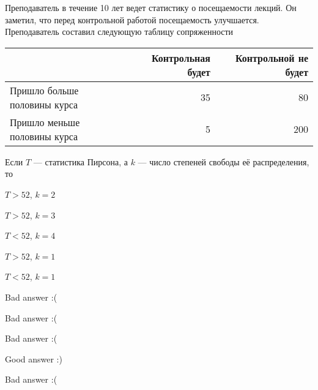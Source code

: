 
\begin{question}
Преподаватель в течение 10 лет ведет статистику о посещаемости лекций.
Он заметил, что перед контрольной работой посещаемость улучшается.
Преподаватель составил следующую таблицу сопряженности

\vspace{5mm}
\begin{tabular}{lrr}
\toprule
& Контрольная будет & Контрольной не будет \\
\midrule
Пришло больше половины курса & 35 & 80 \\
Пришло меньше половины курса & 5 & 200 \\
\bottomrule
\end{tabular}
\vspace{5mm}

Если \(T\) — статистика Пирсона, а \(k\) — число степеней свободы её
распределения, то
\begin{answerlist}
  \item \(T>52\), \(k=2\)
  \item \(T>52\), \(k=3\)
  \item \(T<52\), \(k=4\)
  \item \(T>52\), \(k=1\)
  \item \(T<52\), \(k=1\)
\end{answerlist}
\end{question}

\begin{solution}
\begin{answerlist}
  \item Bad answer :(
  \item Bad answer :(
  \item Bad answer :(
  \item Good answer :)
  \item Bad answer :(
\end{answerlist}
\end{solution}

